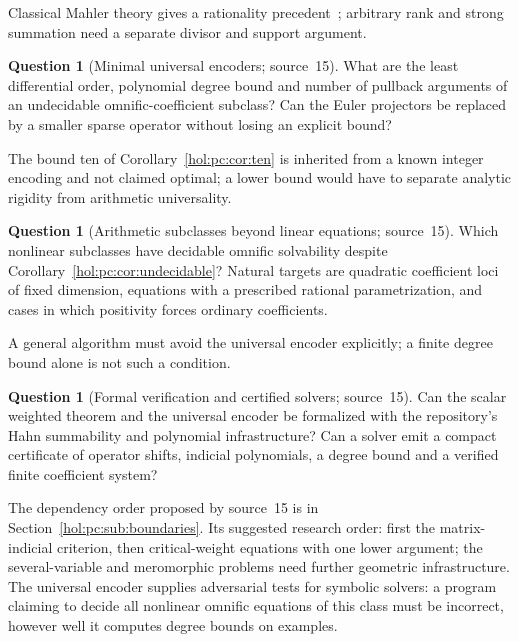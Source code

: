 \documentclass[11pt]{article}
\numberwithin{equation}{section}
\theoremstyle{definition}
\newtheorem{question}[theorem]{Question}
\theoremstyle{remark}
\begin{document}
Classical Mahler theory gives a rationality precedent~\cite{bcr}; arbitrary
rank and strong summation need a separate divisor and support argument.

\begin{question}[Minimal universal encoders; source~15]
\label{hol:pc:q:encoders}
What are the least differential order, polynomial degree bound and number of
pullback arguments of an undecidable omnific-coefficient subclass? Can the
Euler projectors be replaced by a smaller sparse operator without losing an
explicit bound?
\end{question}

The bound ten of Corollary~\ref{hol:pc:cor:ten} is inherited from a known
integer encoding and not claimed optimal; a lower bound would have to separate
analytic rigidity from arithmetic universality.

\begin{question}[Arithmetic subclasses beyond linear equations; source~15]
\label{hol:pc:q:arithmetic}
Which nonlinear subclasses have decidable omnific solvability despite
Corollary~\ref{hol:pc:cor:undecidable}? Natural targets are quadratic
coefficient loci of fixed dimension, equations with a prescribed rational
parametrization, and cases in which positivity forces ordinary coefficients.
\end{question}

A general algorithm must avoid the universal encoder explicitly; a finite
degree bound alone is not such a condition.

\begin{question}[Formal verification and certified solvers; source~15]
\label{hol:pc:q:formal}
Can the scalar weighted theorem and the universal encoder be formalized with
the repository's Hahn summability and polynomial infrastructure? Can a solver
emit a compact certificate of operator shifts, indicial polynomials, a degree
bound and a verified finite coefficient system?
\end{question}

The dependency order proposed by source~15 is in
Section~\ref{hol:pc:sub:boundaries}. Its suggested research order: first the
matrix-indicial criterion, then critical-weight equations with one lower
argument; the several-variable and meromorphic problems need further
geometric infrastructure. The universal encoder supplies adversarial tests
for symbolic solvers: a program claiming to decide all nonlinear omnific
equations of this class must be incorrect, however well it computes degree
bounds on examples.
\end{document}
